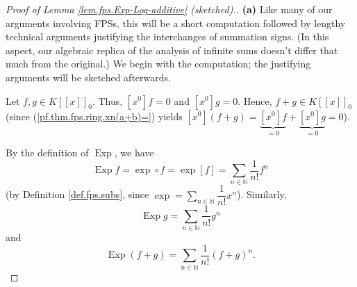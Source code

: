 \begin{proof}
[Proof of Lemma \ref{lem.fps.Exp-Log-additive} (sketched).]\textbf{(a)} Like
many of our arguments involving FPSs, this will be a short computation
followed by lengthy technical arguments justifying the interchanges of
summation signs. (In this aspect, our algebraic replica of the analysis of
infinite sums doesn't differ that much from the original.) We begin with the
computation; the justifying arguments will be sketched afterwards.

Let $f,g\in K\left[  \left[  x\right]  \right]  _{0}$. Thus, $\left[
x^{0}\right]  f=0$ and $\left[  x^{0}\right]  g=0$. Hence, $f+g\in K\left[
\left[  x\right]  \right]  _{0}$ (since (\ref{pf.thm.fps.ring.xn(a+b)=})
yields $\left[  x^{0}\right]  \left(  f+g\right)  =\underbrace{\left[
x^{0}\right]  f}_{=0}+\underbrace{\left[  x^{0}\right]  g}_{=0}=0$).

By the definition of $\operatorname*{Exp}$, we have%
\[
\operatorname*{Exp}f=\exp\circ f=\exp\left[  f\right]  =\sum_{n\in\mathbb{N}%
}\dfrac{1}{n!}f^{n}%
\]
(by Definition \ref{def.fps.subs}, since $\exp=\sum_{n\in\mathbb{N}}\dfrac
{1}{n!}x^{n}$). Similarly,%
\[
\operatorname*{Exp}g=\sum_{n\in\mathbb{N}}\dfrac{1}{n!}g^{n}%
\]
and%
\[
\operatorname*{Exp}\left(  f+g\right)  =\sum_{n\in\mathbb{N}}\dfrac{1}%
{n!}\left(  f+g\right)  ^{n}.
\]



\end{proof}
